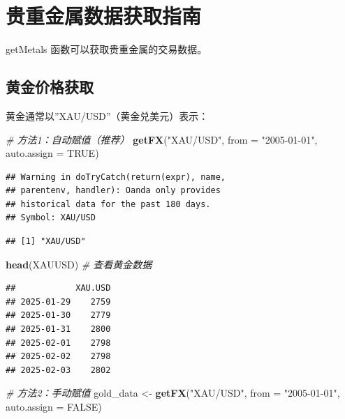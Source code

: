 \documentclass[]{ctexbook}
\newenvironment{Shaded}{\begin{snugshade}}{\end{snugshade}}
\newcommand{\AttributeTok}[1]{\textcolor[rgb]{0.13,0.29,0.53}{#1}}
\newcommand{\CommentTok}[1]{\textcolor[rgb]{0.56,0.35,0.01}{\textit{#1}}}
\newcommand{\ConstantTok}[1]{\textcolor[rgb]{0.56,0.35,0.01}{#1}}
\newcommand{\FunctionTok}[1]{\textcolor[rgb]{0.13,0.29,0.53}{\textbf{#1}}}
\newcommand{\NormalTok}[1]{#1}
\newcommand{\OtherTok}[1]{\textcolor[rgb]{0.56,0.35,0.01}{#1}}
\newcommand{\StringTok}[1]{\textcolor[rgb]{0.31,0.60,0.02}{#1}}
\begin{document}
\section{贵重金属数据获取指南}\label{ux8d35ux91cdux91d1ux5c5eux6570ux636eux83b7ux53d6ux6307ux5357}

getMetals 函数可以获取贵重金属的交易数据。

\subsection{黄金价格获取}\label{ux9ec4ux91d1ux4ef7ux683cux83b7ux53d6}

黄金通常以''XAU/USD''（黄金兑美元）表示：

\begin{Shaded}
\begin{Highlighting}[]
\CommentTok{\# 方法1：自动赋值（推荐）}
\FunctionTok{getFX}\NormalTok{(}\StringTok{"XAU/USD"}\NormalTok{, }\AttributeTok{from =} \StringTok{"2005{-}01{-}01"}\NormalTok{, }\AttributeTok{auto.assign =} \ConstantTok{TRUE}\NormalTok{)}
\end{Highlighting}
\end{Shaded}

\begin{verbatim}
## Warning in doTryCatch(return(expr), name,
## parentenv, handler): Oanda only provides
## historical data for the past 180 days.
## Symbol: XAU/USD
\end{verbatim}

\begin{verbatim}
## [1] "XAU/USD"
\end{verbatim}

\begin{Shaded}
\begin{Highlighting}[]
\FunctionTok{head}\NormalTok{(XAUUSD)  }\CommentTok{\# 查看黄金数据}
\end{Highlighting}
\end{Shaded}

\begin{verbatim}
##            XAU.USD
## 2025-01-29    2759
## 2025-01-30    2779
## 2025-01-31    2800
## 2025-02-01    2798
## 2025-02-02    2798
## 2025-02-03    2802
\end{verbatim}

\begin{Shaded}
\begin{Highlighting}[]
\CommentTok{\# 方法2：手动赋值}
\NormalTok{gold\_data }\OtherTok{\textless{}{-}} \FunctionTok{getFX}\NormalTok{(}\StringTok{"XAU/USD"}\NormalTok{, }\AttributeTok{from =} \StringTok{"2005{-}01{-}01"}\NormalTok{, }\AttributeTok{auto.assign =} \ConstantTok{FALSE}\NormalTok{)}
\end{Highlighting}
\end{Shaded}
\end{document}

